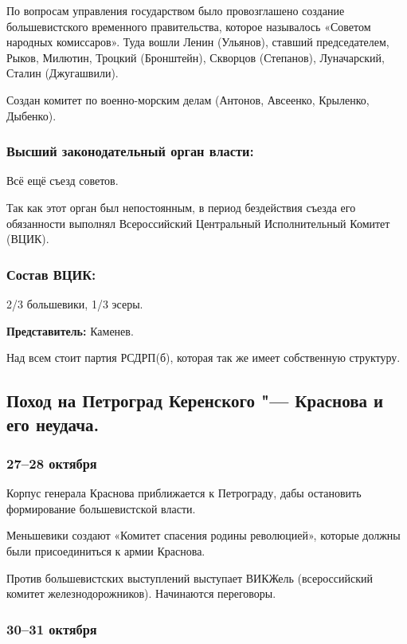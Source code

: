 По вопросам управления государством было провозглашено создание большевистского временного правительства, которое называлось «Советом народных комиссаров». Туда вошли Ленин (Ульянов), ставший председателем, Рыков, Милютин, Троцкий (Бронштейн), Скворцов (Степанов), Луначарский, Сталин (Джугашвили).

Создан комитет по военно-морским делам (Антонов, Авсеенко, Крыленко, Дыбенко).

\subsubsection{\textbf{Высший законодательный орган власти:}}

Всё ещё съезд советов.

Так как этот орган был непостоянным, в период бездействия съезда его обязанности выполнял Всероссийский Центральный Исполнительный Комитет (ВЦИК).

\subsubsection{\textbf{Состав ВЦИК:}}

2/3 большевики, 1/3 эсеры.

\textbf{Представитель:} Каменев.

Над всем стоит партия РСДРП(б), которая так же имеет собственную структуру.

\subsection{Поход на Петроград Керенского "--- Краснова и его неудача.}

\subsubsection{\textbf{27--28 октября}}

Корпус генерала Краснова приближается к Петрограду, дабы остановить формирование большевистской власти.

Меньшевики создают «Комитет спасения родины революцией», которые должны были присоединиться к армии Краснова.

Против большевистских выступлений выступает ВИКЖель (всероссийский комитет железнодорожников). Начинаются переговоры.

\subsubsection{\textbf{30--31 октября}}


